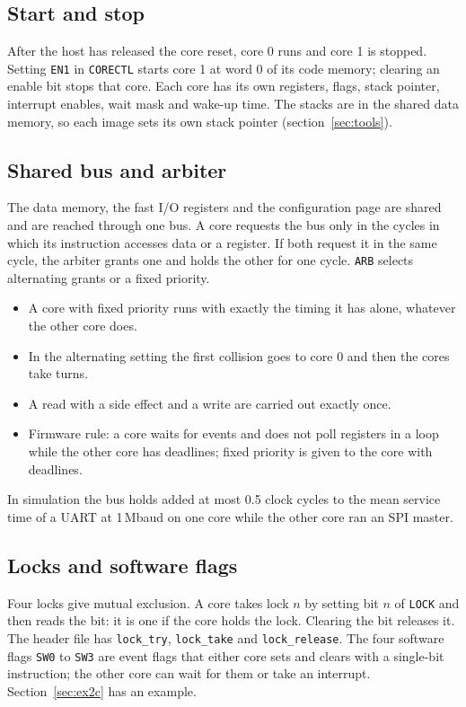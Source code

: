 \documentclass[10pt,a4paper]{article}
\newcommand{\reg}[1]{\texttt{#1}}
\begin{document}
\subsection{Start and stop}

After the host has released the core reset, core 0 runs and core 1 is stopped. Setting \reg{EN1} in \reg{CORECTL}
starts core 1 at word 0 of its code memory; clearing an enable bit stops that core. Each core has its own
registers, flags, stack pointer, interrupt enables, wait mask and wake-up time. The stacks are in the shared
data memory, so each image sets its own stack pointer (section~\ref{sec:tools}).

\subsection{Shared bus and arbiter}

The data memory, the fast I/O registers and the configuration page are shared and are reached through one bus.
A core requests the bus only in the cycles in which its instruction accesses data or a register. If both
request it in the same cycle, the arbiter grants one and holds the other for one cycle. \reg{ARB} selects
alternating grants or a fixed priority.

\begin{itemize}
\item A core with fixed priority runs with exactly the timing it has alone, whatever the other core does.
\item In the alternating setting the first collision goes to core 0 and then the cores take turns.
\item A read with a side effect and a write are carried out exactly once.
\item Firmware rule: a core waits for events and does not poll registers in a loop while the other core has
deadlines; fixed priority is given to the core with deadlines.
\end{itemize}

In simulation the bus holds added at most 0.5 clock cycles to the mean service time of a UART at 1\,Mbaud on one
core while the other core ran an SPI master.

\subsection{Locks and software flags}

Four locks give mutual exclusion. A core takes lock $n$ by setting bit $n$ of \reg{LOCK} and then reads the bit:
it is one if the core holds the lock. Clearing the bit releases it. The header file has \texttt{lock\_try},
\texttt{lock\_take} and \texttt{lock\_release}. The four software flags \reg{SW0} to \reg{SW3} are event flags that
either core sets and clears with a single-bit instruction; the other core can wait for them or take an
interrupt. Section~\ref{sec:ex2c} has an example.
\end{document}

